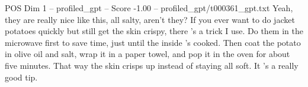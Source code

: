 \begin{textsample}{POS Dim 1 – profiled\_gpt – Score -1.00 – profiled\_gpt/t000361\_gpt.txt}  \label{ex:f1_pos_033}
Yeah, they are really nice like this, all salty, aren't they?
If you ever want to do jacket potatoes quickly but still get the skin crispy, there ’s a trick I use.
Do them in the microwave first to save time, just until the inside ’s cooked.
Then coat the potato in olive oil and salt, wrap it in a paper towel, and pop it in the oven for about five minutes.
That way the skin crisps up instead of staying all soft.
It ’s a really good tip.

\end{textsample}
